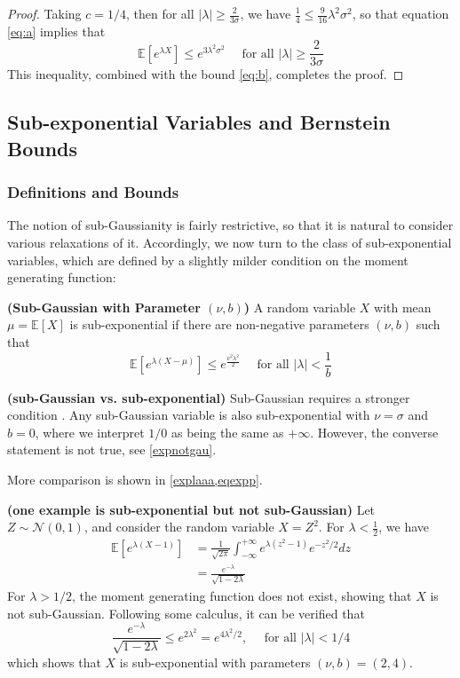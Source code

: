 \documentclass{article}
\newcommand{\bfs}[1]{\textbf{({#1})}}
\begin{document}
\begin{proof}
Taking $c=1/ 4$, then for all $|\lambda| \geq \frac{2}{3 \sigma}$, we have $\frac{1}{4}\le \frac{9}{16}\lambda^2\sigma^2$,
so that equation \cref{eq:a} implies that
$$
\mathbb{E}\left[e^{\lambda X}\right] \le e^{3 \lambda^{2} \sigma^{2}} \quad \text { for all }|\lambda| \geq \frac{2}{3 \sigma}
$$
This inequality, combined with the bound \cref{eq:b}, completes the proof.
\end{proof}
\subsection{Sub-exponential Variables and Bernstein Bounds}\label{ssec:sub_exp}
\subsubsection{Definitions and Bounds}\label{defsub}
The notion of sub-Gaussianity is fairly restrictive, so that it is natural to consider various relaxations of it. Accordingly, we now turn to the class of sub-exponential variables, which are defined by a slightly milder condition on the moment generating function:
\begin{defa}{\bfs{Sub-Gaussian with Parameter $(\nu, b)$}}\label{sub-exp}
A random variable $X$ with mean $\mu=\mathbb{E}[X]$ is sub-exponential if there are non-negative parameters $(\nu, b)$ such that
$$
\mathbb{E}\left[e^{\lambda(X-\mu)}\right] \leq e^{\frac{\nu^{2} \lambda^{2}}{2}} \quad \text { for all }|\lambda|<\frac{1}{b}
$$
\end{defa}
\begin{rema}{\bfs{sub-Gaussian vs. sub-exponential}}
Sub-Gaussian requires a stronger condition . Any sub-Gaussian variable is also sub-exponential with $\nu=\sigma$ and $b=0$, where we interpret $1 / 0$ as being the same as $+\infty$. However, the converse statement is not true, see \cref{expnotgau}.

More comparison is shown in \cref{explaaa,eqexpp}.
\end{rema}

\begin{exma}{\bfs{one example is sub-exponential but not sub-Gaussian}}\label{expnotgau}
  Let $Z \sim \mathcal{N}(0,1)$, and consider the random variable $X=Z^{2}$. For $\lambda<\frac{1}{2}$, we have
$$
\begin{aligned}
\mathbb{E}\left[e^{\lambda(X-1)}\right] &=\frac{1}{\sqrt{2 \pi}} \int_{-\infty}^{+\infty} e^{\lambda\left(z^{2}-1\right)} e^{-z^{2} / 2} d z \\
&=\frac{e^{-\lambda}}{\sqrt{1-2 \lambda}}
\end{aligned}
$$
For $\lambda>1 / 2$, the moment generating function does not exist, showing that $X$ is not sub-Gaussian. Following some calculus, it can be verified that
$$
\frac{e^{-\lambda}}{\sqrt{1-2 \lambda}} \leq e^{2 \lambda^{2}}=e^{4 \lambda^{2} / 2}, \quad \text { for all }|\lambda|<1 / 4
$$
which shows that $X$ is sub-exponential with parameters $(\nu, b)=(2,4)$.
\end{exma}
\end{document}
